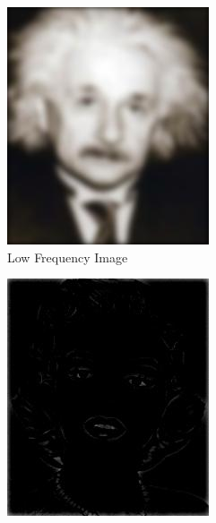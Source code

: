 \documentclass[a4paper,12pt]{article}
\begin{document}
	\begin{figure}[h!]
		\centering
		\begin{subfigure}{0.4\textwidth}
			\centering
			\includegraphics[width=0.99\linewidth]{images/low_freq_ein}
			\caption{Low Frequency Image}
			\label{fig:low_ein}
		\end{subfigure}
		\begin{subfigure}{0.4\textwidth}
			\centering
			\includegraphics[width=0.99\linewidth]{images/high_freq_mar}

\end{subfigure}
\end{figure}
\end{document}
